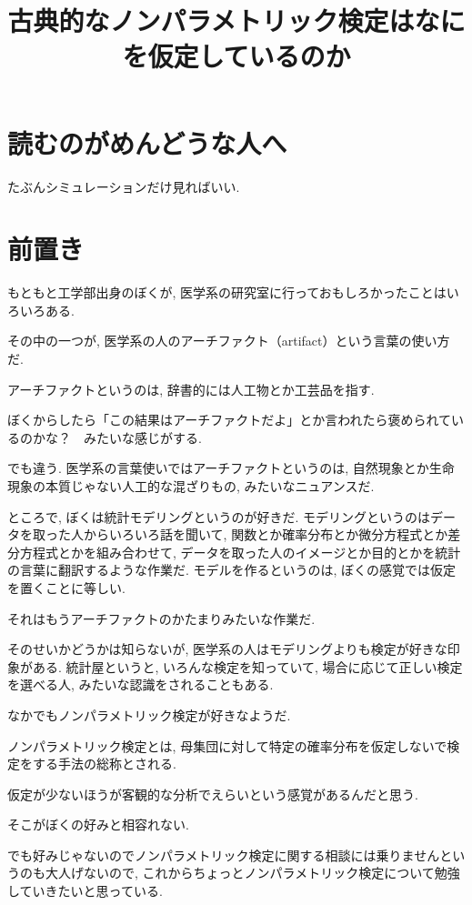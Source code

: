 \documentclass[12pt]{jsarticle}
\title{古典的なノンパラメトリック検定はなにを仮定しているのか}
\author{}
\begin{document}
\maketitle
\section{読むのがめんどうな人へ}

たぶんシミュレーションだけ見ればいい. 

\section{前置き}

もともと工学部出身のぼくが, 医学系の研究室に行っておもしろかったことはいろいろある. 

その中の一つが, 医学系の人のアーチファクト（artifact）という言葉の使い方だ. 

アーチファクトというのは, 辞書的には人工物とか工芸品を指す.

ぼくからしたら「この結果はアーチファクトだよ」とか言われたら褒められているのかな？　みたいな感じがする.

でも違う. 医学系の言葉使いではアーチファクトというのは, 自然現象とか生命現象の本質じゃない人工的な混ざりもの, みたいなニュアンスだ.

ところで, ぼくは統計モデリングというのが好きだ. モデリングというのはデータを取った人からいろいろ話を聞いて, 関数とか確率分布とか微分方程式とか差分方程式とかを組み合わせて, データを取った人のイメージとか目的とかを統計の言葉に翻訳するような作業だ. モデルを作るというのは, ぼくの感覚では仮定を置くことに等しい. 

それはもうアーチファクトのかたまりみたいな作業だ.

そのせいかどうかは知らないが, 医学系の人はモデリングよりも検定が好きな印象がある. 統計屋というと, いろんな検定を知っていて, 場合に応じて正しい検定を選べる人, みたいな認識をされることもある.

なかでもノンパラメトリック検定が好きなようだ. 

ノンパラメトリック検定とは, 母集団に対して特定の確率分布を仮定しないで検定をする手法の総称とされる. 

仮定が少ないほうが客観的な分析でえらいという感覚があるんだと思う.

そこがぼくの好みと相容れない. 

でも好みじゃないのでノンパラメトリック検定に関する相談には乗りませんというのも大人げないので, これからちょっとノンパラメトリック検定について勉強していきたいと思っている.
\end{document}
